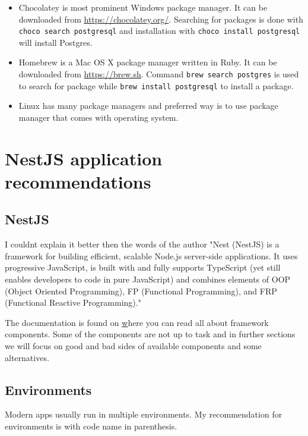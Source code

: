 \documentclass[lang=en,color=green]{elegantbook}
\begin{document}
\begin{itemize}[leftmargin=*]
    \item Chocolatey is most prominent Windows package manager. It can be downloaded from \href{https://chocolatey.org/}{https://chocolatey.org/}.
    Searching for packages is done with \texttt{choco search postgresql} 
    and installation with \texttt{choco install postgresql} will install Postgres.
    \item Homebrew is a Mac OS X package manager written in Ruby. 
    It can be downloaded from \href{https://brew.sh}{https://brew.sh}.
    Command \texttt{brew search postgres}
    is used to search for package while \texttt{brew install postgresql} to install a package.
    \item Linux has many package managers and preferred way is to use package manager
    that comes with operating system.
\end{itemize}

\chapter{NestJS application recommendations}

\section{NestJS}

I couldnt explain it better then the words of the author "Nest (NestJS) is a framework for building 
efficient, scalable Node.js server-side applications.
It uses progressive JavaScript, is built with and fully supports
TypeScript (yet still enables developers to code in pure JavaScript)
and combines elements of OOP (Object Oriented Programming), 
FP (Functional Programming), and FRP (Functional Reactive Programming)."

The documentation is found on \href{https://docs.nestjs.com/} where you can 
read all about framework components. Some of the components are  
not up to task and in further sections we will focus on good and bad 
sides of available components and some alternatives.

\section{Environments}
Modern apps usually run in multiple environments. My recommendation 
for environments is with code name in parenthesis.
\end{document}
